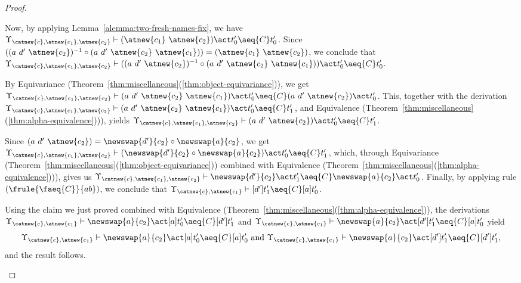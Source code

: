 \begin{proof}
\begin{description}
\begin{enumerate}
\begin{enumerate}
\begin{itemize}
            Now, by applying Lemma~\ref{alemma:two-fresh-names-fix}, we have $\Upsilon_{\catnew{c},\atnew{c_1},\atnew{c_2}} \vdash (\atnew{c_1} \ \atnew{c_2}) \act t_0' \aeq{C} t_0'$. Since $((a \ d' \ \atnew{c_2})^{-1} \circ (a \ d' \ \atnew{c_2} \ \atnew{c_1})) = (\atnew{c_1} \ \atnew{c_2})$, we conclude that $\Upsilon_{\catnew{c},\atnew{c_1},\atnew{c_2}} \vdash ((a \ d' \ \atnew{c_2})^{-1} \circ (a \ d' \ \atnew{c_2} \ \atnew{c_1})) \act t_0' \aeq{C} t_0'$.

            By Equivariance (Theorem~\ref{thm:miscellaneous}(\ref{thm:object-equivariance})), we get $\Upsilon_{\catnew{c},\atnew{c_1},\atnew{c_2}} \vdash (a \ d' \ \atnew{c_2} \ \atnew{c_1}) \act t_0' \aeq{C} (a \ d' \ \atnew{c_2}) \act t_0'$. This, together with the derivation $\Upsilon_{\catnew{c},\atnew{c_1},\atnew{c_2}} \vdash (a \ d' \ \atnew{c_2} \ \atnew{c_1}) \act t_0' \aeq{C} t_1'$, and Equivalence (Theorem~\ref{thm:miscellaneous}(\ref{thm:alpha-equivalence}))), yields $\Upsilon_{\catnew{c},\atnew{c_1},\atnew{c_2}} \vdash (a \ d' \ \atnew{c_2}) \act t_0' \aeq{C} t_1'$.

            Since $(a \ d' \ \atnew{c_2}) = \newswap{d'}{c_2} \circ \newswap{a}{c_2}$, we get $\Upsilon_{\catnew{c},\atnew{c_1},\atnew{c_2}} \vdash (\newswap{d'}{c_2} \circ \newswap{a}{c_2}) \act t_0' \aeq{C} t_1'$, which, through Equivariance (Theorem~\ref{thm:miscellaneous}(\ref{thm:object-equivariance})) combined with Equivalence (Theorem~\ref{thm:miscellaneous}(\ref{thm:alpha-equivalence}))), gives us $\Upsilon_{\catnew{c},\atnew{c_1},\atnew{c_2}} \vdash \newswap{d'}{c_2} \act t_1' \aeq{C} \newswap{a}{c_2} \act t_0'$. Finally, by applying rule $(\frule{\faeq{C}}{ab})$, we conclude that $\Upsilon_{\catnew{c},\atnew{c_1}} \vdash [d']t_1' \aeq{C} [a]t_0'$.

           Using the claim we just proved combined with Equivalence (Theorem~\ref{thm:miscellaneous}(\ref{thm:alpha-equivalence})), the derivations $\Upsilon_{\catnew{c},\atnew{c_1}} \vdash\newswap{a}{c_2}\act[a]t_0'\aeq{C} [d']t_1'$ and $\Upsilon_{\catnew{c},\atnew{c_1}} \vdash \newswap{a}{c_2}\act[d']t_1'\aeq{C} [a]t_0'$ yield
            \[
                \Upsilon_{\catnew{c},\atnew{c_1}} \vdash \newswap{a}{c_2}\act[a]t_0'\aeq{C} [a]t_0' \text{ and } \Upsilon_{\catnew{c},\atnew{c_1}} \vdash \newswap{a}{c_2}\act[d']t_1'\aeq{C} [d']t_1',
            \]
            and the result follows.

            \end{itemize}


\end{enumerate}
\end{enumerate}
\end{description}
\end{proof}
